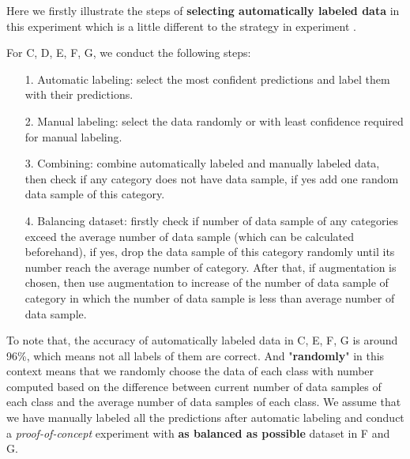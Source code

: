 Here we firstly illustrate the steps of \textbf{selecting automatically labeled data} in this experiment which is a little different to the strategy in experiment . 

For C, D, E, F, G, we conduct the following steps:
\begin{itemize}
	\item[1.] Automatic labeling: select the most confident predictions and label them with their predictions.
	\item[2.] Manual labeling: select the data randomly or with least confidence required for manual labeling.
	\item[3.] Combining: combine automatically labeled and manually labeled data, then check if any category does not have data sample, if yes add one random data sample of this category.
	\item[4.] Balancing dataset: firstly check if number of data sample of any categories exceed the average number of data sample (which can be calculated beforehand), if yes, drop the data sample of this category randomly until its number reach the average number of category. After that, if augmentation is chosen, then use augmentation to increase of the number of data sample of category in which the number of data sample is less than average number of data sample.

\end{itemize}
To note that, the accuracy of automatically labeled data in C, E, F, G is around 96\%, which means not all labels of them are correct. And "\textbf{randomly}" in this context means that we randomly choose the data of each class with number computed based on the difference between current number of data samples of each class and the average number of data samples of each class. We assume that we have manually labeled all the predictions after automatic labeling and conduct a \textit{proof-of-concept} experiment with \textbf{as balanced as possible} dataset in F and G.    


